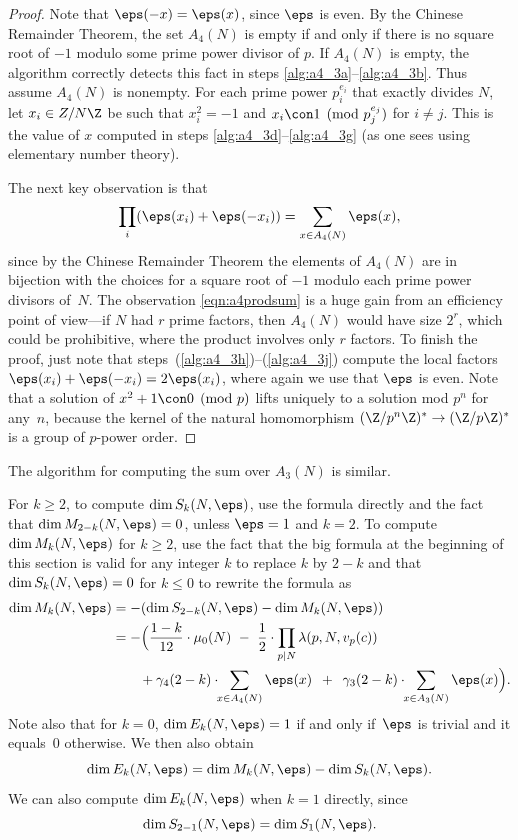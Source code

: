\begin{proof}
  Note that $\eps(-x)=\eps(x)$, since $\eps$ is even.  By the Chinese
  Remainder Theorem, the set $A_4(N)$ is empty if and only if there is
  no square root of $-1$ modulo some prime power divisor of $p$.  If
  $A_4(N)$ is empty, the algorithm correctly detects this fact in
  steps \eqref{alg:a4_3a}--\eqref{alg:a4_3b}.  
  Thus assume $A_4(N)$ is
  nonempty.  For each prime power $p_i^{e_i}$ that exactly divides
  $N$, let $x_i \in Z/N\Z$ be such that $x_i^2 = -1$ and $x_i\con
  1\pmod{p_j^{e_j}}$ for $i \neq j$.  This is the value of $x$
  computed in steps \eqref{alg:a4_3d}--\eqref{alg:a4_3g} (as one sees
  using elementary number theory).

  The next key observation is that 
\begin{equation}\label{eqn:a4prodsum}
  \prod_i (\eps(x_i) + \eps(-x_i)) = 
    \sum_{x \in A_4(N)} \eps(x),
 \end{equation}
 since by the Chinese Remainder Theorem the elements of $A_4(N)$ are
 in bijection with the choices for a square root of $-1$ modulo each
 prime power divisors of~$N$.  The observation \eqref{eqn:a4prodsum}
 is a huge gain from an efficiency point of view---if $N$ had $r$
 prime factors, then $A_4(N)$ would have size $2^r$, which could be
 prohibitive, where the product involves only $r$ factors.  To finish
 the proof, just note that steps~(\ref{alg:a4_3h})--(\ref{alg:a4_3j})
 compute the local factors $\eps(x_i) + \eps(-x_i) = 2\eps(x_i)$,
 where again we use that $\eps$ is even.  Note that a solution
 of $x^2+1 \con 0\pmod{p}$ lifts uniquely to a solution mod $p^n$ for
 any~$n$, because the kernel of the natural homomorphism $(\Z/p^n\Z)^*
 \to (\Z/p\Z)^*$ is a group of $p$-power order.
\end{proof}
The algorithm for computing the sum over $A_3(N)$ is similar.

For $k\geq 2$, to compute $\dim S_k(N,\eps)$, use the formula directly
and the fact that $\dim M_{2-k}(N,\eps) = 0$, unless $\eps=1$ and $k=2$.
To compute $\dim M_k(N,\eps)$ for $k\geq 2$, use the fact that the big
formula at the beginning of this section 
is valid for any integer $k$ to replace $k$
by $2-k$ and 
that $\dim S_k(N,\eps)=0$ for $k\leq 0$ to rewrite the formula as 
\begin{align*}
 \dim M_k(N,\eps) &= - (\dim S_{2-k}(N,\eps) - \dim M_{k}(N,\eps))\\
  &=-\Bigl( \frac{1-k}{12} \cdot \mu_0(N) \,\,-\,\,
         \frac{1}{2} \cdot \prod_{p\mid N} \lambda(p, N, v_p(c))\\
  &\qquad + \gamma_4(2-k) \cdot\!\! 
\sum_{x \in A_4(N)} \eps(x) \,\,\,+\,\,\, 
   \gamma_3(2-k) \cdot \!\! \sum_{x \in A_3(N)} \eps(x)\Bigr).
\end{align*}
Note also that for $k=0$, $\dim E_k(N,\eps) = 1$ if 
and only if~$\eps$ is trivial and it equals~$0$ otherwise.
We then also obtain
$$
 \dim E_k(N,\eps) = \dim M_k(N,\eps) - \dim S_k(N,\eps).
$$
We can also compute $\dim E_k(N,\eps)$ when $k=1$
directly, since $$\dim S_{2-1}(N,\eps) = \dim S_{1}(N,\eps).$$



